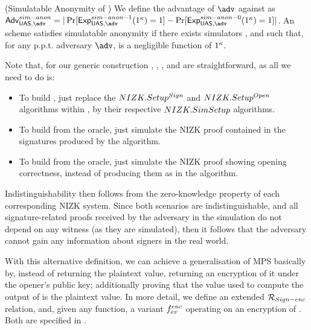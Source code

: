 \begin{definition}{(Simulatable Anonymity of \UAS)}
  \label{def:sim-anonymity-uas}  
  We define the advantage \AdvSimAnon of $\adv$ against \ExpSimAnonb as
  $\AdvSimAnon=|\Pr\lbrack\ExpSimAnono(1^\secpar)=1\rbrack-
  \Pr\lbrack\ExpSimAnonz(1^\secpar)=1\rbrack|$.
  An \UAS scheme satisfies simulatable anonymity if there exists simulators
  \SIMSETUP, \SIMSIGN and \SIMOPEN such that, for any p.p.t. adversary $\adv$,
  \AdvSimAnon is a negligible function of $1^\kappa$.
\end{definition}

Note that, for our generic construction \CUASGen, \SIMSETUP, \SIMSIGN, and
\SIMOPEN are straightforward, as all we need to do is:

\begin{itemize}
\item To build \SIMSETUP, just replace the $NIZK.Setup^{Sign}$ and
  $NIZK.Setup^{Open}$ algorithms within \Setup, by their respective
  $NIZK.SimSetup$ algorithms.
\item To build \SIMSIGN from the \SIGN oracle, just simulate the NIZK proof
  contained in the signatures produced by the \Sign algorithm.
\item To build \SIMOPEN from the \OPEN oracle, just simulate the NIZK proof
  showing opening correctness, instead of producing them as in the \Open
  algorithm.
\end{itemize}

Indistinguishability then follows from the zero-knowledge property of each
corresponding NIZK system. Since both scenarios are indistinguishable, and
all signature-related proofs received by the adversary in the simulation do not
depend on any witness (as they are simulated), then it follows that the
adversary cannot gain any information about signers in the real world.

With this alternative definition, we can achieve a generalisation of MPS
basically by, instead of returning the plaintext \yeval value, returning an
encryption of it under the opener's public key; additionally proving 
that the value used to compute the output of \finsp is the plaintext \yeval
value. In more detail, we define an extended $\mathcal{R}_{Sign-enc}$ relation,
and, given any \feval function, a variant $f_{ev}^{enc}$ operating on an
encryption of \yeval. Both are specified in .

